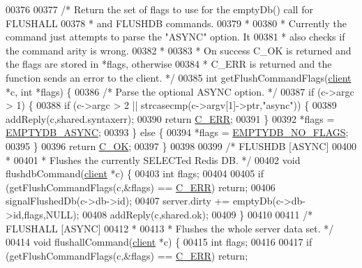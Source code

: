 \begin{DoxyCode}
00376 
00377 \textcolor{comment}{/* Return the set of flags to use for the emptyDb() call for FLUSHALL}
00378 \textcolor{comment}{ * and FLUSHDB commands.}
00379 \textcolor{comment}{ *}
00380 \textcolor{comment}{ * Currently the command just attempts to parse the "ASYNC" option. It}
00381 \textcolor{comment}{ * also checks if the command arity is wrong.}
00382 \textcolor{comment}{ *}
00383 \textcolor{comment}{ * On success C\_OK is returned and the flags are stored in *flags, otherwise}
00384 \textcolor{comment}{ * C\_ERR is returned and the function sends an error to the client. */}
00385 \textcolor{keywordtype}{int} getFlushCommandFlags(\hyperlink{structclient}{client} *c, \textcolor{keywordtype}{int} *flags) \{
00386     \textcolor{comment}{/* Parse the optional ASYNC option. */}
00387     \textcolor{keywordflow}{if} (c->argc > 1) \{
00388         \textcolor{keywordflow}{if} (c->argc > 2 || strcasecmp(c->argv[1]->ptr,\textcolor{stringliteral}{"async"})) \{
00389             addReply(c,shared.syntaxerr);
00390             \textcolor{keywordflow}{return} \hyperlink{server_8h_af98ac28d5f4d23d7ed5985188e6fb7d1}{C\_ERR};
00391         \}
00392         *flags = \hyperlink{server_8h_a83bdc5c1a2af487191bb7ca716494ee7}{EMPTYDB\_ASYNC};
00393     \} \textcolor{keywordflow}{else} \{
00394         *flags = \hyperlink{server_8h_a83a0ecde3a9f1f6bbcae9f4b966a509b}{EMPTYDB\_NO\_FLAGS};
00395     \}
00396     \textcolor{keywordflow}{return} \hyperlink{server_8h_a303769ef1065076e68731584e758d3e1}{C\_OK};
00397 \}
00398 
00399 \textcolor{comment}{/* FLUSHDB [ASYNC]}
00400 \textcolor{comment}{ *}
00401 \textcolor{comment}{ * Flushes the currently SELECTed Redis DB. */}
00402 \textcolor{keywordtype}{void} flushdbCommand(\hyperlink{structclient}{client} *c) \{
00403     \textcolor{keywordtype}{int} flags;
00404 
00405     \textcolor{keywordflow}{if} (getFlushCommandFlags(c,&flags) == \hyperlink{server_8h_af98ac28d5f4d23d7ed5985188e6fb7d1}{C\_ERR}) \textcolor{keywordflow}{return};
00406     signalFlushedDb(c->db->id);
00407     server.dirty += emptyDb(c->db->id,flags,NULL);
00408     addReply(c,shared.ok);
00409 \}
00410 
00411 \textcolor{comment}{/* FLUSHALL [ASYNC]}
00412 \textcolor{comment}{ *}
00413 \textcolor{comment}{ * Flushes the whole server data set. */}
00414 \textcolor{keywordtype}{void} flushallCommand(\hyperlink{structclient}{client} *c) \{
00415     \textcolor{keywordtype}{int} flags;
00416 
00417     \textcolor{keywordflow}{if} (getFlushCommandFlags(c,&flags) == \hyperlink{server_8h_af98ac28d5f4d23d7ed5985188e6fb7d1}{C\_ERR}) \textcolor{keywordflow}{return};

\end{DoxyCode}
